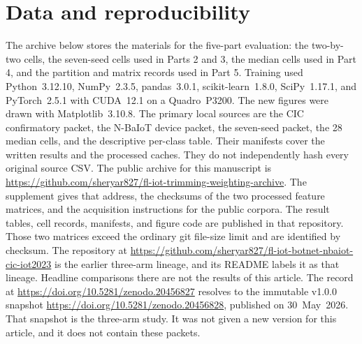 \documentclass{ieeeaccess}
\begin{document}
\section{Data and reproducibility}
The archive below stores the materials for the five-part evaluation: the two-by-two cells, the seven-seed cells used in Parts 2 and 3, the median cells used in Part 4, and the partition and matrix records used in Part 5. Training used Python~3.12.10, NumPy~2.3.5, pandas~3.0.1, scikit-learn~1.8.0, SciPy~1.17.1, and PyTorch~2.5.1 with CUDA~12.1 on a Quadro~P3200. The new figures were drawn with Matplotlib~3.10.8. The primary local sources are the CIC confirmatory packet, the N-BaIoT device packet, the seven-seed packet, the 28 median cells, and the descriptive per-class table. Their manifests cover the written results and the processed caches. They do not independently hash every original source CSV. The public archive for this manuscript is \url{https://github.com/sheryar827/fl-iot-trimming-weighting-archive}. The supplement gives that address, the checksums of the two processed feature matrices, and the acquisition instructions for the public corpora. The result tables, cell records, manifests, and figure code are published in that repository. Those two matrices exceed the ordinary git file-size limit and are identified by checksum. The repository at \url{https://github.com/sheryar827/fl-iot-botnet-nbaiot-cic-iot2023} is the earlier three-arm lineage, and its README labels it as that lineage. Headline comparisons there are not the results of this article. The record at \url{https://doi.org/10.5281/zenodo.20456827} resolves to the immutable v1.0.0 snapshot \url{https://doi.org/10.5281/zenodo.20456828}, published on 30~May~2026. That snapshot is the three-arm study. It was not given a new version for this article, and it does not contain these packets.
\end{document}
